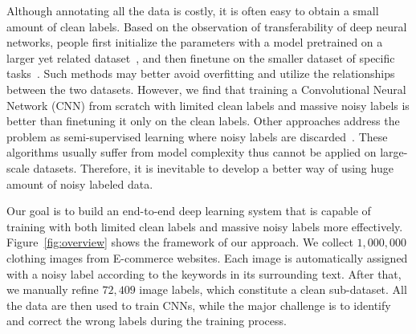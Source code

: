 \documentclass[10pt,twocolumn,letterpaper]{article}
\begin{document}
Although annotating all the data is costly, it is often easy to obtain a small amount of clean labels. Based on the observation of transferability of deep neural networks, people first initialize the parameters with a model pretrained on a larger yet related dataset~\cite{krizhevsky2012imagenet}, and then finetune on the smaller dataset of specific tasks~\cite{oquab2013learning,azizpour2014generic,donahue2013decaf}. Such methods may better avoid overfitting and utilize the relationships between the two datasets. However, we find that training a Convolutional Neural Network (CNN) from scratch with limited clean labels and massive noisy labels is better than finetuning it only on the clean labels. Other approaches address the problem as semi-supervised learning where noisy labels are discarded~\cite{zhu2002learning}. These algorithms usually suffer from model complexity thus cannot be applied on large-scale datasets. Therefore, it is inevitable to develop a better way of using huge amount of noisy labeled data.

Our goal is to build an end-to-end deep learning system that is capable of training with both limited clean labels and massive noisy labels more effectively. Figure~\ref{fig:overview} shows the framework of our approach. We collect $1,000,000$ clothing images from E-commerce websites. Each image is automatically assigned with a noisy label according to the keywords in its surrounding text. After that, we manually refine $72,409$ image labels, which constitute a clean sub-dataset. All the data are then used to train CNNs, while the major challenge is to identify and correct the wrong labels during the training process.
\end{document}
